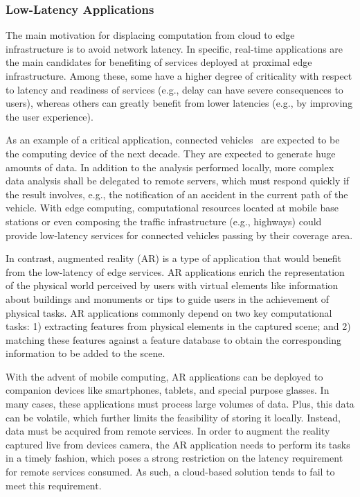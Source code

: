 \subsubsection{Low-Latency Applications}

The main motivation for displacing computation from cloud to edge infrastructure is to avoid network latency. In specific, real-time applications are the main candidates for benefiting of services deployed at proximal edge infrastructure. Among these, some have a higher degree of criticality with respect to latency and readiness of services (e.g., delay can have severe consequences to users), whereas others can greatly benefit from lower latencies (e.g., by improving the user experience).

As an example of a critical application, connected vehicles~\cite{} are expected to be the computing device of the next decade. They are expected to generate huge amounts of data. In addition to the analysis performed locally, more complex data analysis shall be delegated to remote servers, which must respond quickly if the result involves, e.g., the notification of an accident in the current path of the vehicle. With edge computing, computational resources located at mobile base stations or even composing the traffic infrastructure (e.g., highways) could provide low-latency services for connected vehicles passing by their coverage area.

In contrast, augmented reality (AR) is a type of application that would benefit from the low-latency of edge services. AR applications enrich the representation of the physical world perceived by users with virtual elements like information about buildings and monuments or tips to guide users in the achievement of physical tasks. AR applications commonly depend on two key computational tasks: 1) extracting features from physical elements in the captured scene; and 2) matching these features against a feature database to obtain the corresponding information to be added to the scene. 

With the advent of mobile computing, AR applications can be deployed to companion devices like smartphones, tablets, and special purpose glasses. In many cases, these applications must process large volumes of data. Plus, this data can be volatile, which further limits the feasibility of storing it locally. Instead, data must be acquired from remote services. In order to augment the reality captured live from devices camera, the AR application needs to perform its tasks in a timely fashion, which poses a strong restriction on the latency requirement for remote services consumed. As such, a cloud-based solution tends to fail to meet this requirement. 

